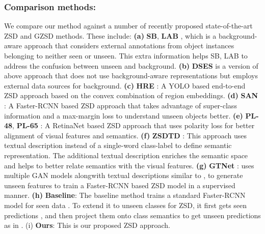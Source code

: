 \documentclass[runningheads]{llncs}
\begin{document}
\subsubsection{Comparison methods:} We compare our method against a number of recently proposed state-of-the-art ZSD and GZSD methods. These include: \textbf{(a)} \textbf{SB}, \textbf{LAB} \cite{bansal2018zero}, which is a background-aware approach that considers external annotations from object instances belonging to neither seen or unseen. This extra information helps SB, LAB \cite{bansal2018zero} to address the confusion between unseen and background. \textbf{(b)} \textbf{DSES} \cite{bansal2018zero} is a version of above approach that does not use background-aware representations but employs external data sources for background. \textbf{(c)} \textbf{HRE} \cite{demirel2018zero}: A YOLO based end-to-end ZSD approach based on the convex combination of region embeddings. \textbf{(d)} \textbf{SAN} \cite{rahman2018zero}: A Faster-RCNN based ZSD approach that takes advantage of super-class information and a max-margin loss to understand unseen objects better. \textbf{(e)} \textbf{PL-48}, \textbf{PL-65} \cite{rahman2018polarity}: A RetinaNet based ZSD approach that uses polarity loss for better alignment of visual features and semantics. \textbf{(f)} \textbf{ZSDTD} \cite{li2019zero}: This approach uses textual description instead of a single-word class-label to define semantic representation. The additional textual description enriches the semantic space and helps to better relate semantics with the visual features. \textbf{(g)} \textbf{GTNet} \cite{zhao2020gtnet}: uses multiple GAN models alongwith textual descriptions similar to \cite{li2019zero}, to generate unseen features to train a Faster-RCNN based ZSD model in a supervised manner. \textbf{(h)} \textbf{Baseline}: The baseline method trains a standard Faster-RCNN model for seen data . To extend it to unseen classes for ZSD, it first gets seen predictions , and then project them onto class semantics to get unseen predictions  as in \cite{rahman2018polarity}. (i) \textbf{Ours}: This is our proposed ZSD approach. 
\end{document}

